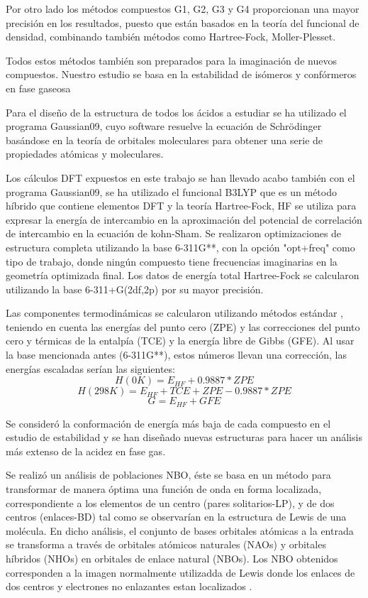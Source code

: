 Por otro lado los métodos compuestos G1, G2, G3 y G4 proporcionan una mayor precisión en los resultados, puesto que están basados en la teoría del funcional de densidad, combinando también métodos como Hartree-Fock, Moller-Plesset.

Todos estos métodos también son preparados para la imaginación de nuevos compuestos. Nuestro estudio se basa en la estabilidad de isómeros y confórmeros  en fase gaseosa

Para el diseño de la estructura de todos los ácidos a estudiar se ha utilizado el programa Gaussian09, cuyo software resuelve la ecuación de Schrödinger basándose en la teoría de orbitales moleculares para obtener una serie de propiedades atómicas y moleculares.

Los cálculos DFT expuestos en este trabajo se han llevado acabo también con el programa Gaussian09, se ha utilizado el funcional B3LYP que es un método híbrido que contiene elementos DFT y la teoría Hartree-Fock, HF se utiliza para expresar la energía de intercambio en la aproximación del potencial de correlación de intercambio en la ecuación de kohn-Sham. Se realizaron optimizaciones de estructura completa utilizando la base 6-311G**, con la opción "opt+freq" como tipo de trabajo, donde ningún compuesto tiene frecuencias imaginarias en la geometría optimizada final. Los datos de energía total Hartree-Fock se calcularon utilizando la base 6-311+G(2df,2p) por su mayor precisión.


Las componentes termodinámicas se calcularon utilizando métodos estándar \cite {quimica4}, teniendo en cuenta las energías del punto cero (ZPE) y las correcciones del punto cero y térmicas de la entalpía (TCE) y la energía libre de Gibbs (GFE). Al usar la base mencionada antes (6-311G**), estos números llevan una corrección, las energías escaladas serían las siguientes: \\
$$ H (0K) = E_{HF} + 0.9887*ZPE $$ 
$$ H (298K) = E_{HF} + TCE + ZPE - 0.9887*ZPE $$ 
$$G = E_{HF} + GFE $$

Se consideró la conformación de energía más baja de cada compuesto en el estudio de estabilidad y se han diseñado nuevas estructuras para hacer un análisis más extenso de la acidez en fase gas.

Se realizó un análisis de poblaciones NBO, éste se basa en un método para transformar de manera óptima una función de onda en forma localizada, correspondiente a los elementos de un centro (pares solitarios-LP), y de dos centros (enlaces-BD) tal como se observarían en la estructura de Lewis de una molécula. En dicho análisis, el conjunto de bases orbitales atómicas a la entrada se transforma a través de orbitales atómicos naturales (NAOs) y orbitales híbridos (NHOs) en orbitales de enlace natural (NBOs). Los NBO obtenidos corresponden a la imagen normalmente utilizadda de Lewis donde los enlaces de dos centros y electrones no enlazantes estan localizados \cite{quimica5}.

